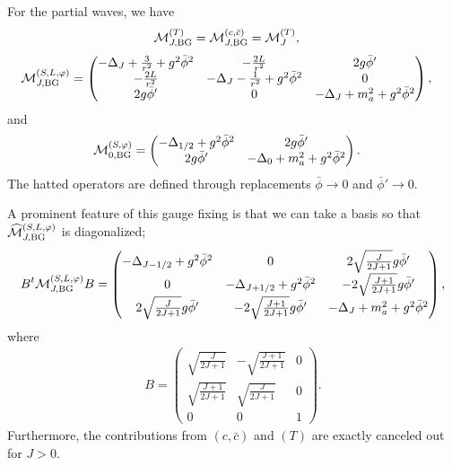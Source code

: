 \documentclass[12pt]{article}
\begin{document}
For the partial waves, we have
\begin{align}
 \mathcal M^{(T)}_{J,\rm BG} & = \mathcal M^{(c,\bar{c})}_{J,\rm BG} = \mathcal M^{(T)}_J,
\end{align}
\begin{align}
 \mathcal M^{(S,L,\varphi)}_{J,\rm BG} & =
 \begin{pmatrix}
  -\Delta_J+\frac{3}{r^2}+g^2\bar\phi^2 & -\frac{2L}{r^2}                         & 2g\bar\phi'                   \\
  -\frac{2L}{r^2}                         & -\Delta_J-\frac{1}{r^2}+g^2\bar\phi^2 & 0                               \\
  2g\bar\phi'                           & 0                                       & -\Delta_J+m_a^2+g^2\bar\phi^2
 \end{pmatrix},
\end{align}
and
\begin{align}
 \mathcal M^{(S,\varphi)}_{0,\rm BG} & =
 \begin{pmatrix}
  -\Delta_{1/2}+g^2\bar\phi^2 & 2g\bar\phi'                   \\
  2g\bar\phi'                 & -\Delta_0+m_a^2+g^2\bar\phi^2
 \end{pmatrix}.
\end{align}
The hatted operators are defined through replacements $\bar\phi\to0$ and
$\bar\phi'\to0$.

A prominent feature of this gauge fixing is that we can take a basis so
that $\widehat{\mathcal M}^{(S,L,\varphi)}_{J,\rm BG}$ is diagonalized;
\begin{align}
 B^t\mathcal M^{(S,L,\varphi)}_{J,\rm BG} B =
 \begin{pmatrix}
  -\Delta_{J-1/2}+g^2\bar\phi^2    & 0                                     & 2\sqrt{\frac{J}{2J+1}}g\bar\phi'    \\
  0                                  & -\Delta_{J+1/2}+g^2\bar\phi^2       & -2\sqrt{\frac{J+1}{2J+1}}g\bar\phi' \\
  2\sqrt{\frac{J}{2J+1}}g\bar\phi' & -2\sqrt{\frac{J+1}{2J+1}}g\bar\phi' & -\Delta_J+m_a^2+g^2\bar\phi^2
 \end{pmatrix},
\end{align}
where
\begin{align}
 B =
 \begin{pmatrix}
  \sqrt{\frac{J}{2J+1}}   & -\sqrt{\frac{J+1}{2J+1}} & 0 \\
  \sqrt{\frac{J+1}{2J+1}} & \sqrt{\frac{J}{2J+1}}    & 0 \\
  0                       & 0                        & 1
 \end{pmatrix}.
\end{align}
Furthermore, the contributions from $(c,\bar{c})$ and $(T)$ are
exactly canceled out for $J>0$.
\end{document}

